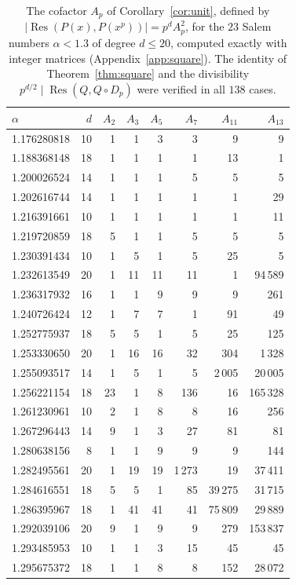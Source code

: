\documentclass[11pt]{amsart}
\theoremstyle{definition}
\theoremstyle{remark}
\DeclareMathOperator{\Res}{Res}
\begin{document}
\begin{table}[ht]
\centering\small
\caption{The cofactor $A_p$ of Corollary~\ref{cor:unit}, defined by $|\Res(P(x),P(x^p))|=p^{d}A_p^2$, for the $23$ Salem numbers $\alpha<1.3$ of degree $d\le20$, computed exactly with integer matrices (Appendix~\ref{app:square}). The identity of Theorem~\ref{thm:square} and the divisibility $p^{d/2}\mid\Res(Q,Q\circ D_p)$ were verified in all $138$ cases.}\label{tab:Ap}
\begin{tabular}{@{}lrrrrrrr@{}}
\toprule
$\alpha$ & $d$ & $A_2$ & $A_3$ & $A_5$ & $A_7$ & $A_{11}$ & $A_{13}$\\
\midrule
1.176280818 & 10 & 1 & 1 & 3 & 3 & 9 & 9\\
1.188368148 & 18 & 1 & 1 & 1 & 1 & 13 & 1\\
1.200026524 & 14 & 1 & 1 & 1 & 5 & 5 & 5\\
1.202616744 & 14 & 1 & 1 & 1 & 1 & 1 & 29\\
1.216391661 & 10 & 1 & 1 & 1 & 1 & 1 & 11\\
1.219720859 & 18 & 5 & 1 & 1 & 5 & 5 & 5\\
1.230391434 & 10 & 1 & 5 & 1 & 5 & 25 & 5\\
1.232613549 & 20 & 1 & 11 & 11 & 11 & 1 & 94\,589\\
1.236317932 & 16 & 1 & 1 & 9 & 9 & 9 & 261\\
1.240726424 & 12 & 1 & 7 & 7 & 1 & 91 & 49\\
1.252775937 & 18 & 5 & 5 & 1 & 5 & 25 & 125\\
1.253330650 & 20 & 1 & 16 & 16 & 32 & 304 & 1\,328\\
1.255093517 & 14 & 1 & 5 & 1 & 5 & 2\,005 & 20\,005\\
1.256221154 & 18 & 23 & 1 & 8 & 136 & 16 & 165\,328\\
1.261230961 & 10 & 2 & 1 & 8 & 8 & 16 & 256\\
1.267296443 & 14 & 9 & 1 & 3 & 27 & 81 & 81\\
1.280638156 & 8 & 1 & 1 & 9 & 9 & 9 & 144\\
1.282495561 & 20 & 1 & 19 & 19 & 1\,273 & 19 & 37\,411\\
1.284616551 & 18 & 5 & 5 & 1 & 85 & 39\,275 & 31\,715\\
1.286395967 & 18 & 1 & 41 & 41 & 41 & 75\,809 & 29\,889\\
1.292039106 & 20 & 9 & 1 & 9 & 9 & 279 & 153\,837\\
1.293485953 & 10 & 1 & 1 & 3 & 15 & 45 & 45\\
1.295675372 & 18 & 1 & 1 & 8 & 8 & 152 & 28\,072\\
\bottomrule
\end{tabular}
\end{table}
\end{document}
